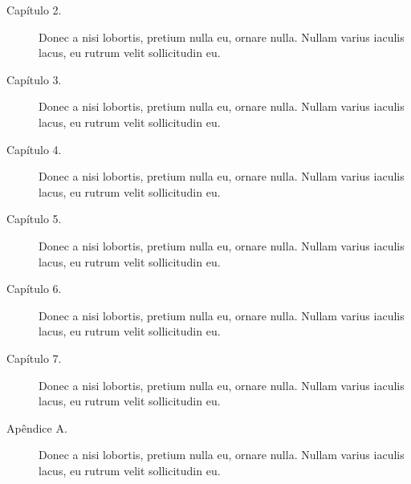 \begin{description}
    \item[Capítulo 2.] Donec a nisi lobortis, pretium nulla eu, ornare nulla. Nullam varius iaculis lacus, eu rutrum velit sollicitudin eu.     
    
    \item[Capítulo 3.] Donec a nisi lobortis, pretium nulla eu, ornare nulla. Nullam varius iaculis lacus, eu rutrum velit sollicitudin eu. 
    
    \item[Capítulo 4.] Donec a nisi lobortis, pretium nulla eu, ornare nulla. Nullam varius iaculis lacus, eu rutrum velit sollicitudin eu. 
    
    \item[Capítulo 5.] Donec a nisi lobortis, pretium nulla eu, ornare nulla. Nullam varius iaculis lacus, eu rutrum velit sollicitudin eu. 
    
    \item[Capítulo 6.] Donec a nisi lobortis, pretium nulla eu, ornare nulla. Nullam varius iaculis lacus, eu rutrum velit sollicitudin eu. 
    
    \item[Capítulo 7.] Donec a nisi lobortis, pretium nulla eu, ornare nulla. Nullam varius iaculis lacus, eu rutrum velit sollicitudin eu. 
    
    \item[Apêndice A.] Donec a nisi lobortis, pretium nulla eu, ornare nulla. Nullam varius iaculis lacus, eu rutrum velit sollicitudin eu. 

\end{description}